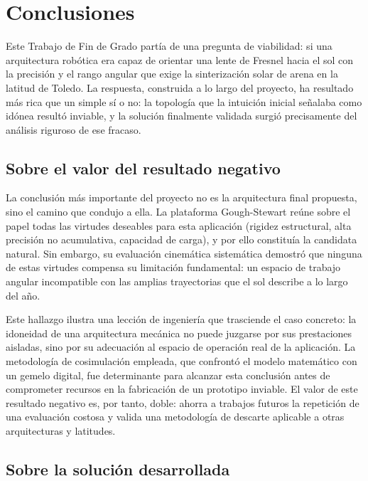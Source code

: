 \chapter{Conclusiones}
\label{ch:conclusiones}


Este Trabajo de Fin de Grado partía de una pregunta de viabilidad: si una arquitectura robótica era capaz de orientar una lente de Fresnel hacia el sol con la precisión y el rango angular que exige la sinterización solar de arena en la latitud de Toledo. La respuesta, construida a lo largo del proyecto, ha resultado más rica que un simple sí o no: la topología que la intuición inicial señalaba como idónea resultó inviable, y la solución finalmente validada surgió precisamente del análisis riguroso de ese fracaso.

\section{Sobre el valor del resultado negativo}

La conclusión más importante del proyecto no es la arquitectura final propuesta, sino el camino que condujo a ella. La plataforma Gough-Stewart reúne sobre el papel todas las virtudes deseables para esta aplicación (rigidez estructural, alta precisión no acumulativa, capacidad de carga), y por ello constituía la candidata natural. Sin embargo, su evaluación cinemática sistemática demostró que ninguna de estas virtudes compensa su limitación fundamental: un espacio de trabajo angular incompatible con las amplias trayectorias que el sol describe a lo largo del año.

Este hallazgo ilustra una lección de ingeniería que trasciende el caso concreto: la idoneidad de una arquitectura mecánica no puede juzgarse por sus prestaciones aisladas, sino por su adecuación al espacio de operación real de la aplicación. La metodología de cosimulación empleada, que confrontó el modelo matemático con un gemelo digital, fue determinante para alcanzar esta conclusión antes de comprometer recursos en la fabricación de un prototipo inviable. El valor de este resultado negativo es, por tanto, doble: ahorra a trabajos futuros la repetición de una evaluación costosa y valida una metodología de descarte aplicable a otras arquitecturas y latitudes.

\section{Sobre la solución desarrollada}

